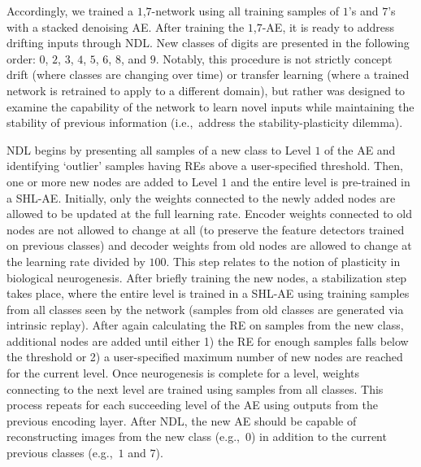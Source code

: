 \documentclass[10pt,conference]{IEEEtran}
\begin{document}
Accordingly, we trained a $1$,$7$-network using all training samples of $1$'s and $7$'s with a stacked denoising AE. After training the $1$,$7$-AE, it is ready to address drifting inputs through NDL. New classes of digits are presented in the following order: $0$, $2$, $3$, $4$, $5$, $6$, $8$, and $9$. Notably, this procedure is not strictly concept drift (where classes are changing over time) or transfer learning (where a trained network is retrained to apply to a different domain), but rather was designed to examine the capability of the network to learn novel inputs while maintaining the stability of previous information (i.e.,~address the stability-plasticity dilemma).

NDL begins by presenting all samples of a new class to Level $1$ of the AE and identifying `outlier' samples having REs above a user-specified threshold. Then, one or more new nodes are added to Level $1$ and the entire level is pre-trained in a SHL-AE. Initially, only the weights connected to the newly added nodes are allowed to be updated at the full learning rate. Encoder weights connected to old nodes are not allowed to change at all (to preserve the feature detectors trained on previous classes) and decoder weights from old nodes are allowed to change at the learning rate divided by $100$. This step relates to the notion of plasticity in biological neurogenesis. After briefly training the new nodes, a stabilization step takes place, where the entire level is trained in a SHL-AE using training samples from all classes seen by the network (samples from old classes are generated via intrinsic replay). After again calculating the RE on samples from the new class, additional nodes are added until either 1) the RE for enough samples falls below the threshold or 2) a user-specified maximum number of new nodes are reached for the current level. Once neurogenesis is complete for a level, weights connecting to the next level are trained using samples from all classes. This process repeats for each succeeding level of the AE using outputs from the previous encoding layer. After NDL, the new AE should be capable of reconstructing images from the new class (e.g.,~$0$) in addition to the current previous classes (e.g.,~$1$ and $7$).
\end{document}
